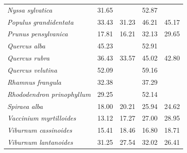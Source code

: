\documentclass{article}
\begin{document}
\begin{table}[ht]
\begin{tabular}{lrrrr}
  \textit{Nyssa sylvatica} & 31.65 &  & 52.87 &  \\ 
  \textit{Populus grandidentata} & 33.43 & 31.23 & 46.21 & 45.17 \\ 
  \textit{Prunus pensylvanica} & 17.81 & 16.21 & 32.13 & 29.65 \\ 
  \textit{Quercus alba} & 45.23 &  & 52.91 &  \\ 
  \textit{Quercus rubra} & 36.43 & 33.57 & 45.02 & 42.80 \\ 
  \textit{Quercus velutina} & 52.09 &  & 59.16 &  \\ 
  \textit{Rhamnus frangula} & 32.38 &  & 37.29 &  \\ 
  \textit{Rhododendron prinophyllum} & 29.25 &  & 52.14 &  \\ 
  \textit{Spiraea alba} & 18.00 & 20.21 & 25.94 & 24.62 \\ 
  \textit{Vaccinium myrtilloides} & 13.12 & 17.27 & 27.00 & 28.95 \\ 
  \textit{Viburnum cassinoides} & 15.41 & 18.46 & 16.80 & 18.71 \\ 
  \textit{Viburnum lantanoides} & 31.25 & 27.54 & 32.02 & 26.41 \\ 
   \hline
\end{tabular}
\end{table}
\clearpage
\newpage
\end{document}
